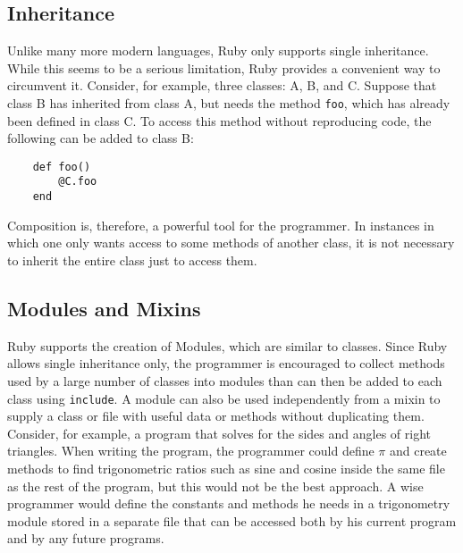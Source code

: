 \documentclass[12pt]{article}
\begin{document}
\subsection{Inheritance}
Unlike many more modern languages, Ruby only supports single inheritance\cite{inheritance}. While this seems to be a serious limitation, Ruby provides a convenient way to circumvent it. Consider, for example, three classes: A, B, and C. Suppose that class B has inherited from class A, but needs the method \verb|foo|, which has already been defined in class C. To access this method without reproducing code, the following can be added to class B:
\begin{lstlisting}
    def foo()
        @C.foo
    end
\end{lstlisting}
Composition is, therefore, a powerful tool for the programmer. In instances in which one only wants access to some methods of another class, it is not necessary to inherit the entire class just to access them.

\subsection{Modules and Mixins}
Ruby supports the creation of Modules, which are similar to classes\cite{generalRb}. Since Ruby allows single inheritance only, the programmer is encouraged to collect methods used by a large number of classes into modules than can then be added to each class using \verb|include|. A module can also be used independently from a mixin to supply a class or file with useful data or methods without duplicating them. Consider, for example, a program that solves for the sides and angles of right triangles. When writing the program, the programmer could define $\pi$ and create methods to find trigonometric ratios such as sine and cosine inside the same file as the rest of the program, but this would not be the best approach. A wise programmer would define the constants and methods he needs in a trigonometry module stored in a separate file that can be accessed both by his current program and by any future programs\cite{moduletutorial}.
\end{document}
